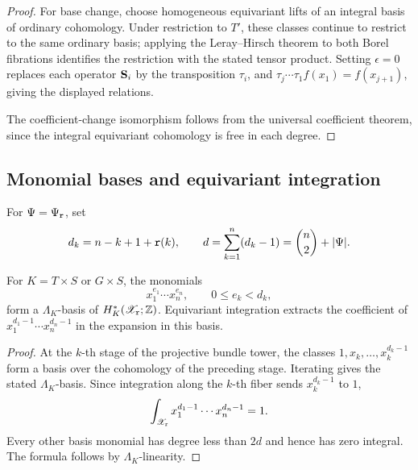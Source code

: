\begin{proof}
For base change, choose homogeneous equivariant lifts of an integral basis of ordinary cohomology.
Under restriction to $T'$, these classes continue to restrict to the same ordinary basis;
applying the Leray--Hirsch theorem to both Borel fibrations identifies the restriction with the stated tensor product.
Setting $\epsilon=0$ replaces each operator $\mathbf S_i$ by the transposition $\tau_i$,
and $\tau_j\cdots\tau_1f(x_1)=f(x_{j+1})$, giving the displayed relations.

The coefficient-change isomorphism follows from the universal coefficient
theorem, since the integral equivariant cohomology is free in each degree.
\end{proof}

\subsection{Monomial bases and equivariant integration}

For $\Psi=\Psi_{\mathtt r}$, set
\[
 d_k=n-k+1+\mathtt r(k),\qquad
 d=\sum_{k=1}^n(d_k-1)=\binom n2+|\Psi|.
\]

\begin{corollary}\label{cor:normal_forms}
For $K=T\times S$ or $G\times S$, the monomials
\[
 x_1^{e_1}\cdots x_n^{e_n},\qquad 0\leq e_k<d_k,
\]
form a $\Lambda_K$-basis of $H^*_K(\mathscr X_{\mathtt r};\mathbb Z)$.
Equivariant integration extracts the coefficient of
$x_1^{d_1-1}\cdots x_n^{d_n-1}$ in the expansion in this basis.
\end{corollary}

\begin{proof}
At the $k$-th stage of the projective bundle tower, the classes
$1,x_k,\dots,x_k^{d_k-1}$ form a basis over the cohomology of the preceding
stage. Iterating gives the stated $\Lambda_K$-basis.
Since integration along the $k$-th fiber sends $x_k^{d_k-1}$ to $1$,
\[
 \int_{\mathscr X_{\mathtt r}}x_1^{d_1-1}\cdots x_n^{d_n-1}=1.
\]
Every other basis monomial has degree less than $2d$ and hence has zero
integral. The formula follows by $\Lambda_K$-linearity.
\end{proof}


